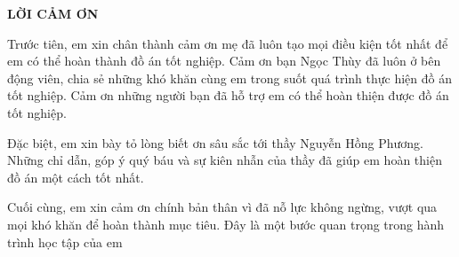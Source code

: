 \documentclass[../DoAn.tex]{subfiles}
\begin{document}
\begin{center}
    \Large{\textbf{LỜI CẢM ƠN}}\\
\end{center}
\vspace{1cm}
Trước tiên, em xin chân thành cảm ơn mẹ đã luôn tạo mọi điều kiện tốt nhất để em có thể hoàn thành đồ án tốt nghiệp. Cảm ơn bạn Ngọc Thùy đã luôn ở bên động viên, chia sẻ những khó khăn cùng em trong suốt quá trình thực hiện đồ án tốt nghiệp. Cảm ơn những người bạn đã hỗ trợ em có thể hoàn thiện được đồ án tốt nghiệp. 

Đặc biệt, em xin bày tỏ lòng biết ơn sâu sắc tới thầy Nguyễn Hồng Phương. Những chỉ dẫn, góp ý quý báu và sự kiên nhẫn của thầy đã giúp em hoàn thiện đồ án một cách tốt nhất.

Cuối cùng, em xin cảm ơn chính bản thân vì đã nỗ lực không ngừng, vượt qua mọi khó khăn để hoàn thành mục tiêu. Đây là một bước quan trọng trong hành trình học tập của em 
\end{document}
